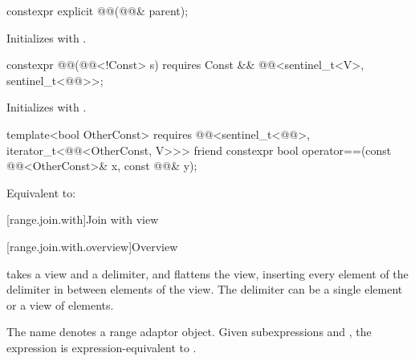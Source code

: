 %
\begin{itemdecl}
constexpr explicit @@(@@& parent);
\end{itemdecl}

\begin{itemdescr}
\pnum
\effects
Initializes  with .
\end{itemdescr}

%
\begin{itemdecl}
constexpr @@(@@<!Const> s)
  requires Const && @@<sentinel_t<V>, sentinel_t<@@>>;
\end{itemdecl}

\begin{itemdescr}
\pnum
\effects
Initializes  with .
\end{itemdescr}


\begin{itemdecl}
template<bool OtherConst>
  requires @@<sentinel_t<@@>, iterator_t<@@<OtherConst, V>>>
friend constexpr bool operator==(const @@<OtherConst>& x, const @@& y);
\end{itemdecl}

\begin{itemdescr}
\pnum
\effects
Equivalent to: 
\end{itemdescr}

[range.join.with]{Join with view}

[range.join.with.overview]{Overview}

\pnum
{} takes a view and a delimiter, and
flattens the view,
inserting every element of the delimiter
in between elements of the view.
The delimiter can be a single element or a view of elements.

\pnum
{}%
The name  denotes
a range adaptor object.
Given subexpressions  and ,
the expression  is expression-equivalent to
.

